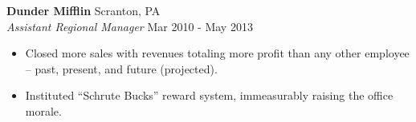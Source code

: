 \textbf{Dunder Mifflin} \hfill Scranton, PA\\
\textit{Assistant Regional Manager} \hfill Mar 2010 - May 2013\\
\vspace{-1mm}
\begin{itemize} \itemsep 1pt
	\item Closed more sales with revenues totaling more profit than any other employee – past, present, and future (projected).
	\item Instituted “Schrute Bucks” reward system, immeasurably raising the office morale.
\end{itemize}
